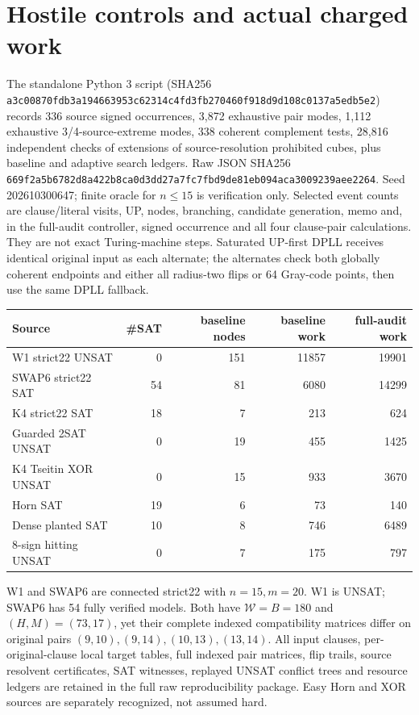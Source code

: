 \documentclass[11pt]{article}
\begin{document}
\section{Hostile controls and actual charged work}
The standalone Python 3 script (SHA256 \texttt{a3c00870fdb3a194663953c62314c4fd3fb270460f918d9d108c0137a5edb5e2}) records 336 source signed occurrences, 3,872 exhaustive pair modes, 1,112 exhaustive 3/4-source-extreme modes, 338 coherent complement tests, 28,816 independent checks of extensions of source-resolution prohibited cubes, plus baseline and adaptive search ledgers. Raw JSON SHA256 \texttt{669f2a5b6782d8a422b8ca0d3dd27a7fc7fbd9de81eb094aca3009239aee2264}. Seed 202610300647; finite oracle for $n\le15$ is verification only. Selected event counts are clause/literal visits, UP, nodes, branching, candidate generation, memo and, in the full-audit controller, signed occurrence and all four clause-pair calculations. They are not exact Turing-machine steps. Saturated UP-first DPLL receives identical original input as each alternate; the alternates check both globally coherent endpoints and either all radius-two flips or 64 Gray-code points, then use the same DPLL fallback.

\begin{center}\begin{tabular}{lrrrr}
\toprule Source & \#SAT & baseline nodes & baseline work & full-audit work\\\midrule
W1 strict22 UNSAT & 0&151&11857&19901\\
SWAP6 strict22 SAT &54&81&6080&14299\\
K4 strict22 SAT &18&7&213&624\\
Guarded 2SAT UNSAT &0&19&455&1425\\
K4 Tseitin XOR UNSAT &0&15&933&3670\\
Horn SAT &19&6&73&140\\
Dense planted SAT &10&8&746&6489\\
8-sign hitting UNSAT &0&7&175&797\\
\bottomrule\end{tabular}\end{center}

W1 and SWAP6 are connected strict22 with $n=15,m=20$. W1 is UNSAT; SWAP6 has 54 fully verified models. Both have $\mathcal W=B=180$ and $(H,M)=(73,17)$, yet their complete indexed compatibility matrices differ on original pairs $(9,10),(9,14),(10,13),(13,14)$. All input clauses, per-original-clause local target tables, full indexed pair matrices, flip trails, source resolvent certificates, SAT witnesses, replayed UNSAT conflict trees and resource ledgers are retained in the full raw reproducibility package. Easy Horn and XOR sources are separately recognized, not assumed hard.
\end{document}
